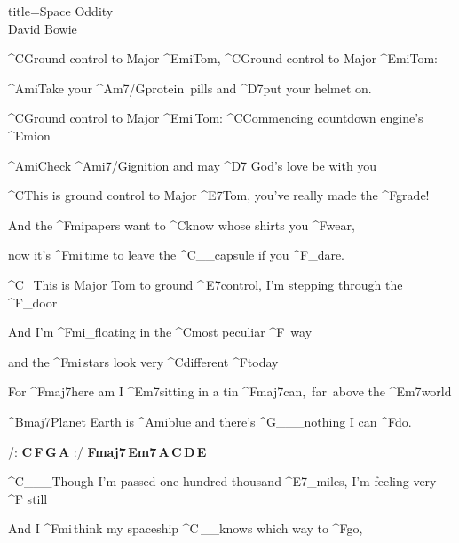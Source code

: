 \begin{song}{title=\predtitle\centering Space Oddity \\\large David Bowie  \vspace*{-0.3cm}}  %

\nejvetsi
\begin{centerjustified}

\sloka 
	^{C\z}Ground control to Major ^{Emi\z}Tom, ^{C\z}Ground control to Major ^{Emi\z}Tom:

	^{Ami}Take your ^{Am7/G\z}protein~pills and ^{D7}put your helmet on.

	^{C\z}Ground control to Major ^{Emi\,}Tom:  ^{C\z}Commencing countdown engine's ^{Emi\z}on~~

	^{Ami\z}Check ^{Ami7/G}ignition and may ^{D7\,\,}God's love be with you

	^{C\z }This is ground control to Major ^{E7}Tom, you've really made the ^{F\z}grade!

	And the ^{Fmi\z }papers want to ^{C\z }know whose shirts you ^{F\z}wear,

	now it's ^{Fmi\,}time to leave the ^{C{\color{white}\_\_}}capsule if you ^{F{\color{white}\_}}dare.

	^{C{\color{white}\_}}This is Major Tom to ground ^{\,E7}control, I'm stepping through the ^{F{\color{white}\_}}door

	And I'm ^{Fmi{\color{white}\_}}floating in the ^{C\z}most peculiar ^{F\,\,\,}way 

	and the ^{Fmi\,}stars look very ^{C\z}different ^{F}today

	For ^{Fmaj7}here am I ^{Em7}sitting in a tin ^{Fmaj7\:}can,~far~above the ^{Em7}world

	^{Bmaj7}Planet Earth is ^{Ami}blue and there's ^{G{\color{white}\_\_\_}}nothing I can ^{F}do.

	\phantom{.}

	\phantom{.}

/: \textbf{C\,F\,G\,A} :/ \textbf{Fmaj7\,Em7\,A\,C\,D\,E}

\end{centerjustified}
\newpage
\begin{centerjustified}

\sloka
	^{C{\color{white}\_\_\_}}Though I'm passed one hundred thousand ^{E7{\color{white}\_}}miles, I'm feeling very ^{F\,\,}still

	And I ^{Fmi\,}think my spaceship ^{C\,{\color{white}\_\_}}knows which way to ^{F}go,


\end{centerjustified}
\end{song}
